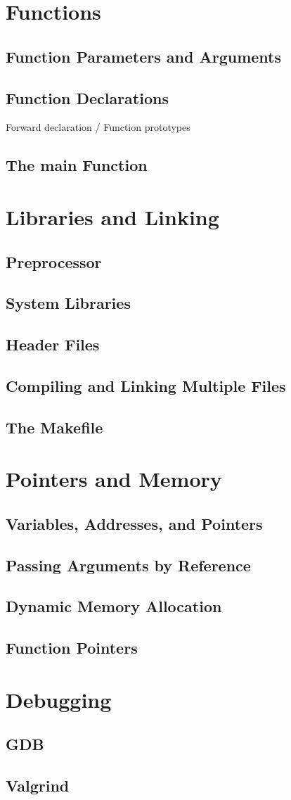 \chapter{Functions}
    \section{Function Parameters and Arguments}
    \section{Function Declarations}
    Forward declaration / Function prototypes
    \section{The main Function}

\chapter{Libraries and Linking}
    \section{Preprocessor}
    \section{System Libraries}
    \section{Header Files}
    \section{Compiling and Linking Multiple Files}
    \section{The Makefile}

\chapter{Pointers and Memory}
    \section{Variables, Addresses, and Pointers}
    \section{Passing Arguments by Reference}
    \section{Dynamic Memory Allocation}
    \section{Function Pointers}

\chapter{Debugging}
    \section{GDB}
    \section{Valgrind}